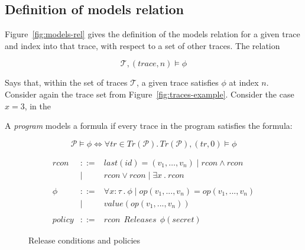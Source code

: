 \documentclass[conference]{IEEEtran}
\theoremstyle{definition}
\begin{document}
\subsection{Definition of models relation}

Figure~\ref{fig:models-rel} gives the definition of the models
relation for a given trace and index into that trace, with respect to
a set of other traces.  The relation

\[
\mathcal{T}, (trace, n) \models \phi
\]

Says that, within the set of traces $\mathcal{T}$, a given trace
satisfies $\phi$ at index $n$.  Consider again the trace set from
Figure~\ref{fig:traces-example}.  Consider the case $x = 3$, in the

A \emph{program} models a formula if every trace in the program
satisfies the formula:

\[
\mathcal{P} \models \phi \iff \forall tr \in Tr(\mathcal{P}). \, Tr(\mathcal{P}),(tr,0) \models \phi
\]

\begin{figure}
  \begin{displaymath}
    \begin{array}{rcl}
      rcon & ::= &
      last(id) = ( v_1 , \dots , v_n ) \mid rcon \wedge rcon \\ 
      & \mid & rcon \lor rcon \mid \exists x ~.~ rcon
      \\ \\
      \phi & ::= & \forall x : \tau ~.~ \phi \mid op (v_1 , ... , v_n) = op (v_1 , ... , v_n) \\
      & \mid & value(op (v_1 , ... , v_n))
      \\ \\
      policy & ::= & rcon ~~ Releases ~~ \phi(secret)
    \end{array}
  \end{displaymath}    
  \caption{Release conditions and policies}
  \label{fig:rcons}
\end{figure}
\end{document}
